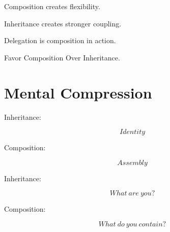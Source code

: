 \documentclass[11pt,a4paper]{book}
\begin{document}
\begin{rosettarule}

Composition creates flexibility.

\end{rosettarule}


\begin{rosettarule}

Inheritance creates stronger coupling.

\end{rosettarule}


\begin{rosettarule}

Delegation is composition in action.

\end{rosettarule}


\begin{rosettarule}

Favor Composition Over Inheritance.

\end{rosettarule}


\section{Mental Compression}

Inheritance:

\[
Identity
\]


Composition:

\[
Assembly
\]


Inheritance:

\[
What\ are\ you?
\]


Composition:

\[
What\ do\ you\ contain?
\]

\end{document}

